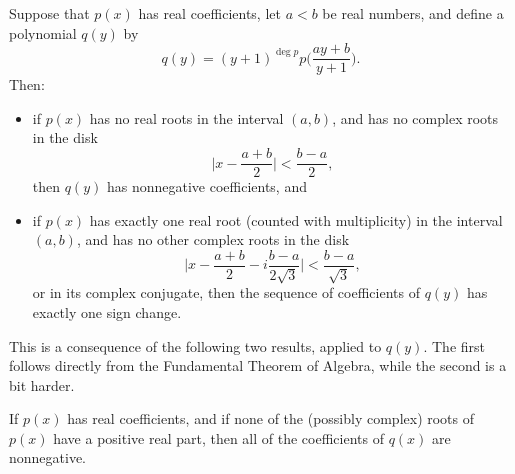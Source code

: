 \begin{thm} Suppose that $p(x)$ has real coefficients, let $a < b$ be real numbers, and define a polynomial $q(y)$ by
\[
q(y) = (y+1)^{\deg p}p\Big(\frac{ay + b}{y + 1}\Big).
\]
Then:
\begin{itemize}
\item if $p(x)$ has no real roots in the interval $(a,b)$, and has no complex roots in the disk
\[
\Big|x - \frac{a+b}{2}\Big| < \frac{b-a}{2},
\]
then $q(y)$ has nonnegative coefficients, and

\item if $p(x)$ has exactly one real root (counted with multiplicity) in the interval $(a,b)$, and has no other complex roots in the disk
\[
\Big|x - \frac{a+b}{2} - i\frac{b-a}{2\sqrt{3}}\Big| < \frac{b-a}{\sqrt{3}},
\]
or in its complex conjugate, then the sequence of coefficients of $q(y)$ has exactly one sign change.
\end{itemize}
\end{thm}

This is a consequence of the following two results, applied to $q(y)$. The first follows directly from the Fundamental Theorem of Algebra, while the second is a bit harder.

\begin{prop} If $p(x)$ has real coefficients, and if none of the (possibly complex) roots of $p(x)$ have a positive real part, then all of the coefficients of $q(x)$ are nonnegative.
\end{prop}

